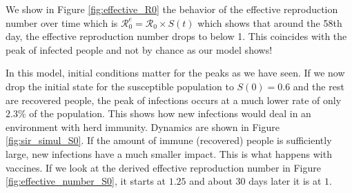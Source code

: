 \documentclass[a4paper,11pt]{article}
\theoremstyle{definition}
\theoremstyle{plain}
\begin{document}
We show in Figure \ref{fig:effective_R0} the behavior of the effective reproduction number over time which is \(\mathcal{R}^e_0 = \mathcal{R}_0 \times S(t)\) which shows that around the 58th day, the effective reproduction number drops to below 1. This coincides with the peak of infected people and not by chance as our model shows!

In this model, initial conditions matter for the peaks as we have seen. If we now drop the initial state for the susceptible population to \(S(0) = 0.6\) and the rest are recovered people, the peak of infections occurs at a much lower rate of only \(2.3\%\) of the population. This shows how new infections would deal in an environment with herd immunity. Dynamics are shown in Figure \ref{fig:sir_simul_S0}. If the amount of immune (recovered) people is sufficiently large, new infections have a much smaller impact. This is what happens with vaccines. If we look at the derived effective reproduction number in Figure \ref{fig:effective_number_S0}, it starts at \(1.25\) and about 30 days later it is at \(1\).
\end{document}
